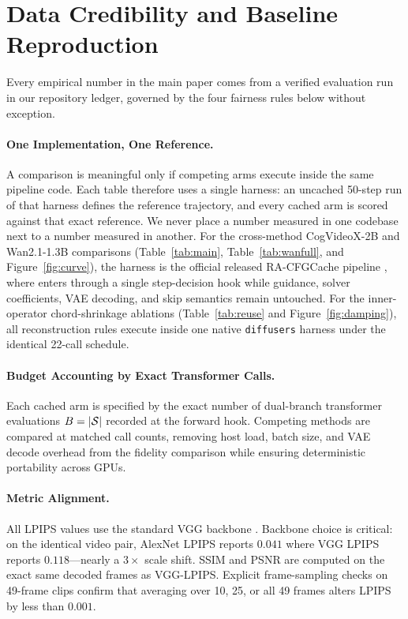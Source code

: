 \section{Data Credibility and Baseline Reproduction}
\label{app:credibility}

Every empirical number in the main paper comes from a verified evaluation run in our repository ledger, governed by the four fairness rules below without exception.

\paragraph{One Implementation, One Reference.}
A comparison is meaningful only if competing arms execute inside the same pipeline code. Each table therefore uses a single harness: an uncached 50-step run of that harness defines the reference trajectory, and every cached arm is scored against that exact reference. We never place a number measured in one codebase next to a number measured in another. For the cross-method CogVideoX-2B and Wan2.1-1.3B comparisons (Table~\ref{tab:main}, Table~\ref{tab:wanfull}, and Figure~\ref{fig:curve}), the harness is the official released RA-CFGCache pipeline \citep{liu2026racfgcache}, where \method{} enters through a single step-decision hook while guidance, solver coefficients, VAE decoding, and skip semantics remain untouched. For the inner-operator chord-shrinkage ablations (Table~\ref{tab:reuse} and Figure~\ref{fig:damping}), all reconstruction rules execute inside one native \texttt{diffusers} harness under the identical 22-call schedule.

\paragraph{Budget Accounting by Exact Transformer Calls.}
Each cached arm is specified by the exact number of dual-branch transformer evaluations $B = |\mathcal{S}|$ recorded at the forward hook. Competing methods are compared at matched call counts, removing host load, batch size, and VAE decode overhead from the fidelity comparison while ensuring deterministic portability across GPUs.

\paragraph{Metric Alignment.}
All LPIPS values use the standard VGG backbone \citep{zhang2018lpips}. Backbone choice is critical: on the identical video pair, AlexNet LPIPS reports $0.041$ where VGG LPIPS reports $0.118$---nearly a $3\times$ scale shift. SSIM and PSNR are computed on the exact same decoded frames as VGG-LPIPS. Explicit frame-sampling checks on 49-frame clips confirm that averaging over 10, 25, or all 49 frames alters LPIPS by less than $0.001$.

